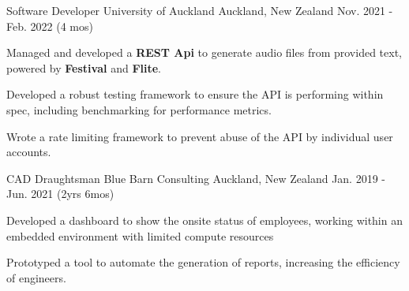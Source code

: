 \begin{cventries}
  \cventry
    {Software Developer} %
    {University of Auckland} %
    {Auckland, New Zealand} %
    {Nov. 2021 - Feb. 2022 (4 mos)} %
    {
      \begin{cvitems} %
        \item {Managed and developed a \textbf{REST Api} to generate audio files from provided text, powered by \textbf{Festival} and \textbf{Flite}.}
        \item {Developed a robust testing framework to ensure the API is performing within spec, including benchmarking for performance metrics.}
        \item {Wrote a rate limiting framework to prevent abuse of the API by individual user accounts.}
      \end{cvitems}
    }


  \cventry
    {CAD Draughtsman} %
    {Blue Barn Consulting} %
    {Auckland, New Zealand} %
    {Jan. 2019 - Jun. 2021 (2yrs 6mos)} %
    {
      \begin{cvitems} %
        \item {Developed a dashboard to show the onsite status of employees, working within an embedded environment with limited compute resources}
        \item {Prototyped a tool to automate the generation of reports, increasing the efficiency of engineers.}
      \end{cvitems}
    }


\end{cventries}
